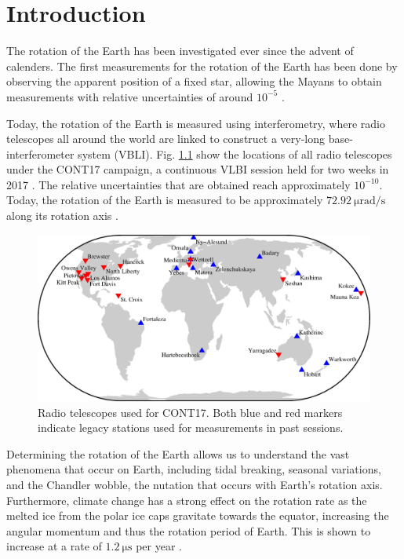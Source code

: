 \documentclass[a4paper]{report}
\numberwithin{equation}{section}
\begin{document}
\tableofcontents

\chapter{Introduction}

The rotation of the Earth has been investigated ever since the advent of calenders. 
The first measurements for the rotation of the Earth has been done by observing the apparent
position of a fixed star, allowing the Mayans to obtain measurements with relative uncertainties of around $10^{-5}$ \cite{Groh2021}.

Today, the rotation of the Earth is measured using interferometry, where radio telescopes
all around the world are linked to construct a very-long base-interferometer system (VBLI). Fig. \ref{fig:vlbi_locs}
show the locations of all radio telescopes under the CONT17 campaign, a continuous VLBI session held for two weeks
in 2017 \cite{Behrend2020}. The relative
uncertainties that are obtained reach approximately $10^{-10}$. Today, the rotation of the Earth is 
measured to be approximately $\SI{72.92}{\micro\radian\per\second}$ along its rotation axis \cite{Groh2021}. \par 

\begin{figure}[h!]
	\centering
	\includegraphics[width=0.6\columnwidth]{cont17_legacy.jpg}
	\caption{Radio telescopes used for CONT17. Both blue and red markers
	indicate legacy stations used for measurements in past sessions.}
	\label{fig:vlbi_locs}
\end{figure}


Determining the rotation of the Earth allows us to understand the vast phenomena that occur on Earth,
including tidal breaking, seasonal variations, and the Chandler wobble, the nutation that occurs with Earth's
rotation axis. Furthermore, climate change has a strong effect on the rotation rate as the melted ice from the 
polar ice caps gravitate towards the equator, increasing the angular momentum and thus the rotation period of Earth.
This is shown to increase at a rate of $\SI{1.2}{\micro\second}$ per year \cite{Groh2021}. \par 
\end{document}
